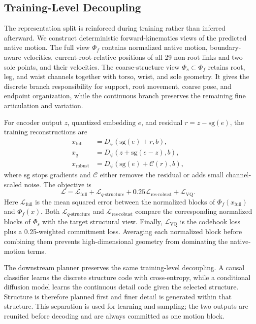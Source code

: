 \documentclass[conference]{IEEEtran}
\begin{document}
\subsection{Training-Level Decoupling}
The representation split is reinforced during training rather than inferred afterward. We construct deterministic forward-kinematics views of the predicted native motion. The full view $\Phi_f$ contains normalized native motion, boundary-aware velocities, current-root-relative positions of all 29 non-root links and two sole points, and their velocities. The coarse-structure view $\Phi_s\subset\Phi_f$ retains root, leg, and waist channels together with torso, wrist, and sole geometry. It gives the discrete branch responsibility for support, root movement, coarse pose, and endpoint organization, while the continuous branch preserves the remaining fine articulation and variation.

For encoder output $z$, quantized embedding $e$, and residual $r=z-\mathrm{sg}(e)$, the training reconstructions are
\begin{align}
    x_{\mathrm{full}} &=D_\psi(\mathrm{sg}(e)+r,b),\\
    x_{q} &=D_\psi(z+\mathrm{sg}(e-z),b),\\
    x_{\mathrm{robust}} &=D_\psi(\mathrm{sg}(e)+\mathcal{C}(r),b),
\end{align}
where $\mathrm{sg}$ stops gradients and $\mathcal{C}$ either removes the residual or adds small channel-scaled noise. The objective is
\begin{equation}
    \mathcal{L}=\mathcal{L}_{\mathrm{full}}+
    \mathcal{L}_{q\text{-}\mathrm{structure}}+
    0.25\mathcal{L}_{\mathrm{res\text{-}robust}}+
    \mathcal{L}_{\mathrm{VQ}}.
    \label{eq:codec_loss}
\end{equation}
Here $\mathcal{L}_{\mathrm{full}}$ is the mean squared error between the normalized blocks of $\Phi_f(x_{\mathrm{full}})$ and $\Phi_f(x)$. Both $\mathcal{L}_{q\text{-}\mathrm{structure}}$ and $\mathcal{L}_{\mathrm{res\text{-}robust}}$ compare the corresponding normalized blocks of $\Phi_s$ with the target structural view. Finally, $\mathcal{L}_{\mathrm{VQ}}$ is the codebook loss plus a 0.25-weighted commitment loss. Averaging each normalized block before combining them prevents high-dimensional geometry from dominating the native-motion terms.

The downstream planner preserves the same training-level decoupling. A causal classifier learns the discrete structure code with cross-entropy, while a conditional diffusion model learns the continuous detail code given the selected structure. Structure is therefore planned first and finer detail is generated within that structure. This separation is used for learning and sampling; the two outputs are reunited before decoding and are always committed as one motion block.
\end{document}
